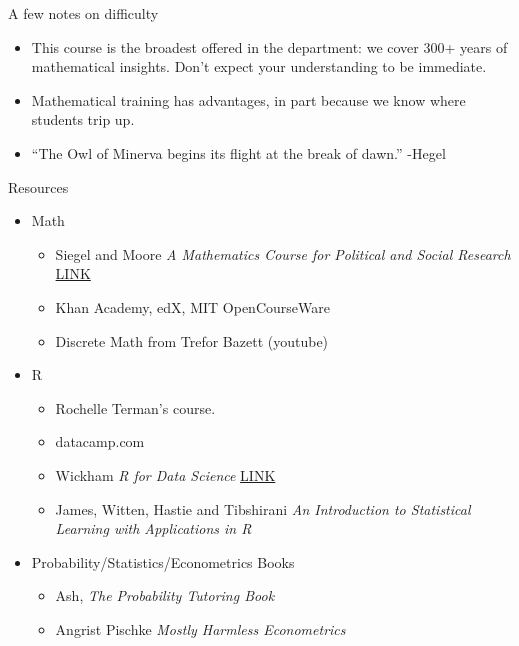 \documentclass[aspectratio=169]{beamer}
\numberwithin{equation}{section}
\begin{document}
\begin{frame}{A few notes on difficulty}

\begin{itemize}

\item This course is the broadest offered in the department: we cover 300+ years of mathematical insights. \pause Don't expect your understanding to be immediate.\pause
\item Mathematical training has advantages, in part because we know where students trip up.
\item ``The Owl of Minerva begins its flight at the break of dawn.'' -Hegel 


\end{itemize}

\end{frame}


\begin{frame}{Resources}

\begin{itemize}
\item Math
\begin{itemize}
\item Siegel and Moore \emph{A Mathematics Course for Political and Social Research} \href{http://people.duke.edu/~das76/Mathematics\%20for\%20Political\%20and\%20Social\%20Research\%20Syllabus\_Siegel.pdf}{LINK}
\item Khan Academy, edX, MIT OpenCourseWare
\item Discrete Math from Trefor Bazett (youtube)
\end{itemize}
\item R
\begin{itemize}
\item Rochelle Terman's course.
\item datacamp.com
\item Wickham \emph{R for Data Science} \href{http://r4ds.had.co.nz}{LINK}
\item James, Witten, Hastie and Tibshirani \emph{An Introduction to Statistical Learning with Applications in R}
\end{itemize}
\item Probability/Statistics/Econometrics Books
\begin{itemize}
\item Ash, \emph{The Probability Tutoring Book}
\item Angrist  Pischke \emph{Mostly Harmless Econometrics}
\end{itemize}
\end{itemize}

\end{frame}
\end{document}
